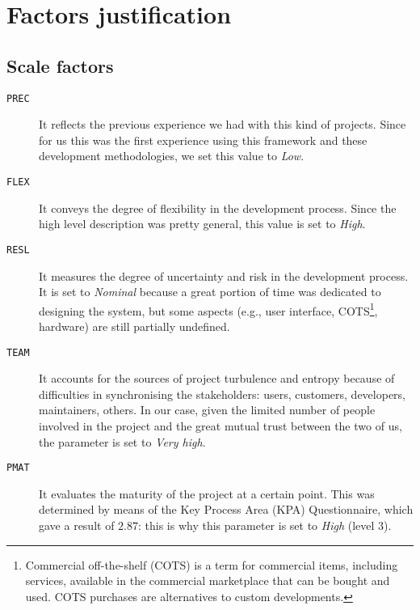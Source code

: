 \chapter{Factors justification}\label{chap:justification}

\section{Scale factors}

\begin{description}
	
	
	\item [\normalfont\texttt{PREC}] It reflects the previous experience we had with this kind of projects. Since for us this was the first experience using this framework and these development methodologies, we set this value to \emph{Low}.
	
	\item [\normalfont\texttt{FLEX}] It conveys the degree of flexibility in the development process. Since the high level description was pretty general, this value is set to \emph{High}.
	
	\item [\normalfont\texttt{RESL}] It measures the degree of uncertainty and risk in the development process. It is set to \emph{Nominal} because a great portion of time was dedicated to designing the system, but some aspects (e.g., user interface, COTS\footnote{Commercial off-the-shelf (COTS) is a term for commercial items, including services, available in the commercial marketplace that can be bought and used. COTS purchases are alternatives to custom developments.}, hardware) are still partially undefined.
	
	\item [\normalfont\texttt{TEAM}] It accounts for the sources of project turbulence and entropy because of difficulties in synchronising the stakeholders: users, customers, developers, maintainers, others. In our case, given the limited number of people involved in the project and the great mutual trust between the two of us, the parameter is set to \emph{Very high}.
	
	\item [\normalfont\texttt{PMAT}] It evaluates the maturity of the project at a certain point. This was determined by means of the Key Process Area (KPA) Questionnaire, which gave a result of $ 2.87 $: this is why this parameter is set to \emph{High} (level 3).

\end{description}


















